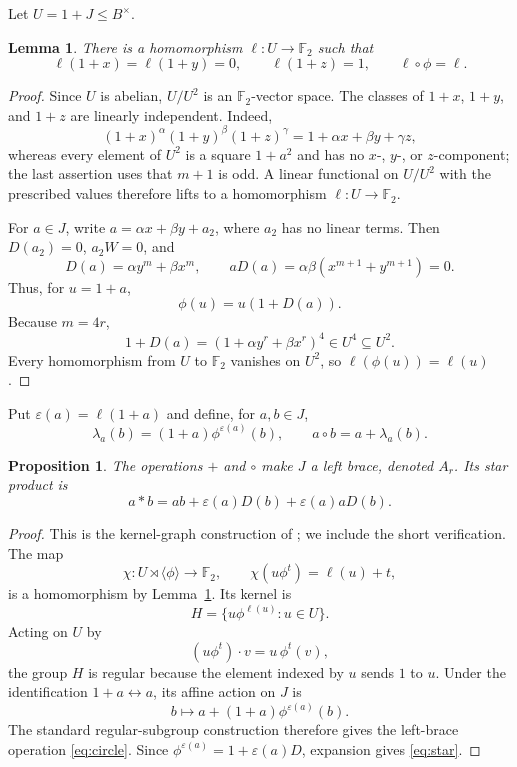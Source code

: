 \documentclass[11pt]{amsart}
\newtheorem{lemma}[theorem]{Lemma}
\newtheorem{proposition}[theorem]{Proposition}
\newcommand{\F}{\mathbb{F}}
\begin{document}
Let $U=1+J\leq B^\times$.

\begin{lemma}\label{lem:character}
There is a homomorphism $\ell:U\to\F_2$ such that
\[
 \ell(1+x)=\ell(1+y)=0,
 \qquad
 \ell(1+z)=1,
 \qquad
 \ell\circ\phi=\ell.
\]
\end{lemma}

\begin{proof}
Since $U$ is abelian, $U/U^2$ is an $\F_2$-vector space. The classes of
$1+x$, $1+y$, and $1+z$ are linearly independent. Indeed,
\[
 (1+x)^\alpha(1+y)^\beta(1+z)^\gamma
 =1+\alpha x+\beta y+\gamma z,
\]
whereas every element of $U^2$ is a square $1+a^2$ and has no $x$-, $y$-,
or $z$-component; the last assertion uses that $m+1$ is odd. A linear
functional on $U/U^2$ with the prescribed values therefore lifts to a
homomorphism $\ell:U\to\F_2$.

For $a\in J$, write $a=\alpha x+\beta y+a_2$, where $a_2$ has no linear
terms. Then $D(a_2)=0$, $a_2W=0$, and
\[
 D(a)=\alpha y^m+\beta x^m,
 \qquad
 aD(a)=\alpha\beta(x^{m+1}+y^{m+1})=0.
\]
Thus, for $u=1+a$,
\[
 \phi(u)=u(1+D(a)).
\]
Because $m=4r$,
\[
 1+D(a)=(1+\alpha y^r+\beta x^r)^4\in U^4\subseteq U^2.
\]
Every homomorphism from $U$ to $\F_2$ vanishes on $U^2$, so
$\ell(\phi(u))=\ell(u)$.
\end{proof}

Put $\varepsilon(a)=\ell(1+a)$ and define, for $a,b\in J$,
\begin{equation}\label{eq:circle}
 \lambda_a(b)=(1+a)\phi^{\varepsilon(a)}(b),
 \qquad
 a\circ b=a+\lambda_a(b).
\end{equation}

\begin{proposition}\label{prop:brace}
The operations $+$ and $\circ$ make $J$ a left brace, denoted $A_r$. Its
star product is
\begin{equation}\label{eq:star}
 a*b=ab+\varepsilon(a)D(b)+\varepsilon(a)aD(b).
\end{equation}
\end{proposition}

\begin{proof}
This is the kernel-graph construction of
\cite[Proposition~2.2]{Verbeken}; we include the short verification. The map
\[
 \chi:U\rtimes\langle\phi\rangle\longrightarrow\F_2,
 \qquad
 \chi(u\phi^t)=\ell(u)+t,
\]
is a homomorphism by Lemma~\ref{lem:character}. Its kernel is
\[
 H=\{u\phi^{\ell(u)}:u\in U\}.
\]
Acting on $U$ by
\[
 (u\phi^t)\mathbin{\cdot}v=u\,\phi^t(v),
\]
the group $H$ is regular because the element indexed by $u$ sends $1$ to
$u$. Under the identification $1+a\leftrightarrow a$, its affine action on
$J$ is
\[
 b\longmapsto a+(1+a)\phi^{\varepsilon(a)}(b).
\]
The standard regular-subgroup construction therefore gives the left-brace
operation \eqref{eq:circle}. Since
$\phi^{\varepsilon(a)}=1+\varepsilon(a)D$, expansion gives
\eqref{eq:star}.
\end{proof}
\end{document}
